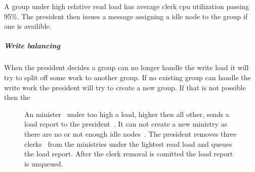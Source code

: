 A group under high relative read load has average clerk cpu utilization passing 95\%. The president then issues a \raft{} message assigning a idle node to the group if one is availible. %
%
\subparagraph*{Write balancing}
When the president decides a group can no longer handle the write load it will try to split off some work to another group. If no existing group can handle the write work the president will try to create a new group. If that is not possible then the 




\begin{figure}[htbp]
	\centering
	
	\caption{An minister~\amdsLeg{} under too high a load, higher then all other, sends a load report to the president~\presidentLeg{}. It can not create a new ministry as there are no or not enough idle nodes~\umdsLeg{}. The president removes three clerks~\cmdsLeg{} from the ministries under the lightest read load and queues the load report. After the clerk removal is comitted the load report is unqueued. }
	\label{fig:subtree}
\end{figure}
